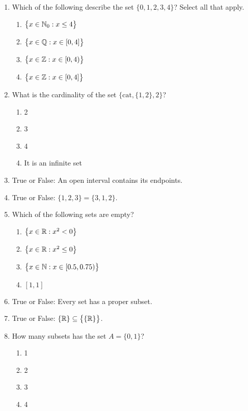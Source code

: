 \pagestyle{empty}


\begin{enumerate}
  \item Which of the following describe the set $\{0,1,2,3,4\}$? Select all that apply.
  \begin{enumerate}
		\item $\bigl\{x\in\mathbb{N}_0:x\le 4\bigr\}$
		\item $\bigl\{x\in\mathbb{Q}:x\in [0,4]\bigr\}$
		\item $\bigl\{x\in\mathbb{Z}:x\in [0,4)\bigr\}$
		\item $\bigl\{x\in\mathbb{Z}:x\in [0,4]\bigr\}$
	\end{enumerate}
    
  \item What is the cardinality of the set $\bigl\{\text{cat}, \{1,2\},2\bigr\}$?
  \begin{enumerate}
		\item 2
    \item 3
    \item 4
    \item It is an infinite set
  \end{enumerate}
    
  \item True or False: An open interval contains its endpoints.
    
  \item True or False: $\{1,2,3\}=\{3,1,2\}$.
    
  \item Which of the following sets are empty?
  \begin{enumerate}
    \item $\bigl\{x\in\mathbb{R}:x^2<0\bigr\}$
    \item $\bigl\{x\in\mathbb{R}:x^2\le 0\bigr\}$
    \item $\bigl\{x\in\mathbb{N}:x\in[0.5,0.75)\bigr\}$
    \item $[1,1]$
  \end{enumerate}
    
  \item True or False: Every set has a proper subset.
    
  \item True or False: $\{\mathbb{R}\}\subseteq\bigl\{\{\mathbb{R}\}\bigr\}$.
    
  \item How many subsets has the set $A=\{0,1\}$?
  \begin{enumerate}
 		\item 1
    \item 2
    \item 3
    \item 4
  \end{enumerate}
    

\end{enumerate}

